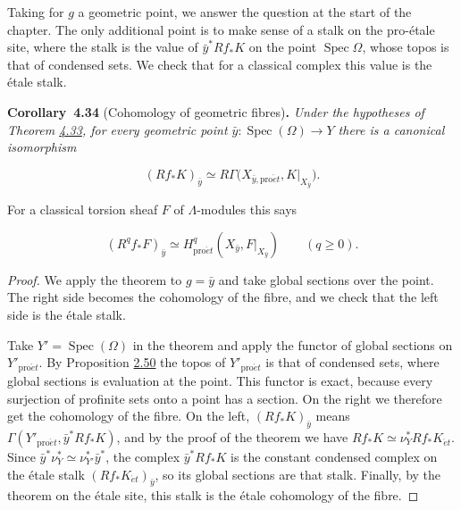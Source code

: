 \documentclass[11pt]{article}
\newenvironment{bpstatement}[2]{\par\addvspace{0.6\baselineskip}\noindent\textbf{#1}#2\textbf{.}\enspace\ignorespaces}
  {\par\addvspace{0.4\baselineskip}}
\newenvironment{bpstatementit}[2]{\begin{bpstatement}{#1}{#2}\itshape\ignorespaces}{\end{bpstatement}}
\begin{document}
\label{bp385}%
Taking for \(g\) a geometric point, we answer the question at the start of the chapter. The only additional point is to make sense of a stalk on the pro-étale site, where the stalk is the value of \(\bar y^*Rf_*K\) on the point \(\operatorname{Spec}\Omega\), whose topos is that of condensed sets. We check that for a classical complex this value is the étale stalk.

\label{bp386}%
\begin{bpstatementit}{Corollary~4.34}{ (Cohomology of geometric fibres)}
Under the hypotheses of Theorem \hyperref[bp382]{4.33}, for every geometric point \(\bar y:\operatorname{Spec}(\Omega)\to Y\) there is a canonical isomorphism

\[
(Rf_*K)_{\bar y}\simeq
R\Gamma\bigl(X_{\bar y,\mathrm{pro}\acute{e}t},K|_{X_{\bar y}}\bigr).
\]

For a classical torsion sheaf \(F\) of \(\Lambda\)-modules this says

\[
(R^qf_*F)_{\bar y}\simeq
H^q_{\mathrm{pro}\acute{e}t}(X_{\bar y},F|_{X_{\bar y}})\qquad(q\geq0).
\]
\end{bpstatementit}

\begin{proof}[{Proof}]\label{bp387}%
We apply the theorem to \(g=\bar y\) and take global sections over the point. The right side becomes the cohomology of the fibre, and we check that the left side is the étale stalk.

Take \(Y'=\operatorname{Spec}(\Omega)\) in the theorem and apply the functor of global sections on \(Y'_{\mathrm{pro}\acute{e}t}\). By Proposition \hyperref[bp153]{2.50} the topos of \(Y'_{\mathrm{pro}\acute{e}t}\) is that of condensed sets, where global sections is evaluation at the point. This functor is exact, because every surjection of profinite sets onto a point has a section. On the right we therefore get the cohomology of the fibre. On the left, \((Rf_*K)_{\bar y}\) means \(\Gamma(Y'_{\mathrm{pro}\acute{e}t},\bar y^*Rf_*K)\), and by the proof of the theorem we have \(Rf_*K\simeq\nu_Y^*Rf_*K_{\acute{e}t}\). Since \(\bar y^*\nu_Y^*\simeq\nu_{Y'}^*\bar y^*\), the complex \(\bar y^*Rf_*K\) is the constant condensed complex on the étale stalk \((Rf_*K_{\acute{e}t})_{\bar y}\), so its global sections are that stalk. Finally, by the theorem on the étale site, this stalk is the étale cohomology of the fibre.
\end{proof}
\end{document}
